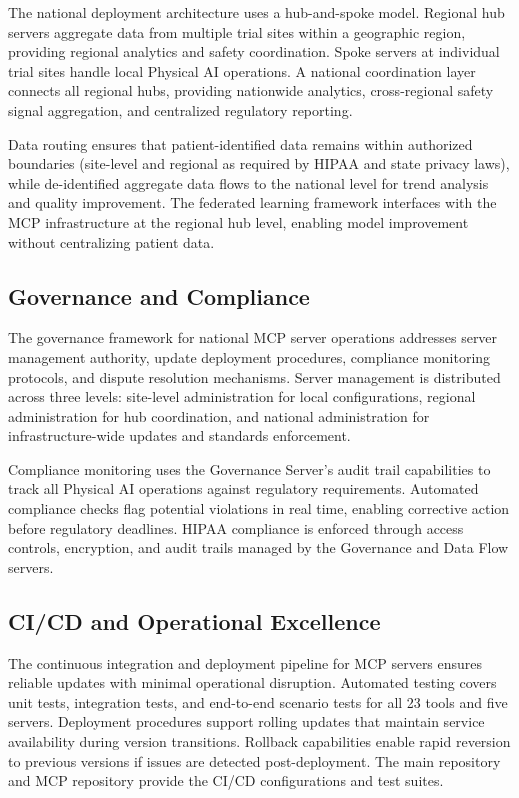 The national deployment architecture uses a hub-and-spoke model. Regional hub
servers aggregate data from multiple trial sites within a geographic region,
providing regional analytics and safety coordination. Spoke servers at
individual trial sites handle local Physical AI operations. A national
coordination layer connects all regional hubs, providing nationwide analytics,
cross-regional safety signal aggregation, and centralized regulatory reporting.

Data routing ensures that patient-identified data remains within authorized
boundaries (site-level and regional as required by HIPAA \cite{hipaa} and state
privacy laws), while de-identified aggregate data flows to the national level
for trend analysis and quality improvement. The federated learning framework
\cite{fl-paper} interfaces with the MCP infrastructure at the regional hub
level, enabling model improvement without centralizing patient data.

\subsection{Governance and Compliance}
\label{subsec:mcp-governance}

The governance framework for national MCP server operations addresses server
management authority, update deployment procedures, compliance monitoring
protocols, and dispute resolution mechanisms. Server management is distributed
across three levels: site-level administration for local configurations,
regional administration for hub coordination, and national administration for
infrastructure-wide updates and standards enforcement.

Compliance monitoring uses the Governance Server's audit trail capabilities to
track all Physical AI operations against regulatory requirements. Automated
compliance checks flag potential violations in real time, enabling corrective
action before regulatory deadlines. HIPAA \cite{hipaa} compliance is enforced
through access controls, encryption, and audit trails managed by the
Governance and Data Flow servers.

\subsection{CI/CD and Operational Excellence}
\label{subsec:mcp-cicd}

The continuous integration and deployment pipeline for MCP servers ensures
reliable updates with minimal operational disruption. Automated testing covers
unit tests, integration tests, and end-to-end scenario tests for all 23 tools
and five servers. Deployment procedures support rolling updates that maintain
service availability during version transitions. Rollback capabilities enable
rapid reversion to previous versions if issues are detected post-deployment.
The main repository \cite{main-repo} and MCP repository \cite{mcp-repo}
provide the CI/CD configurations and test suites.

